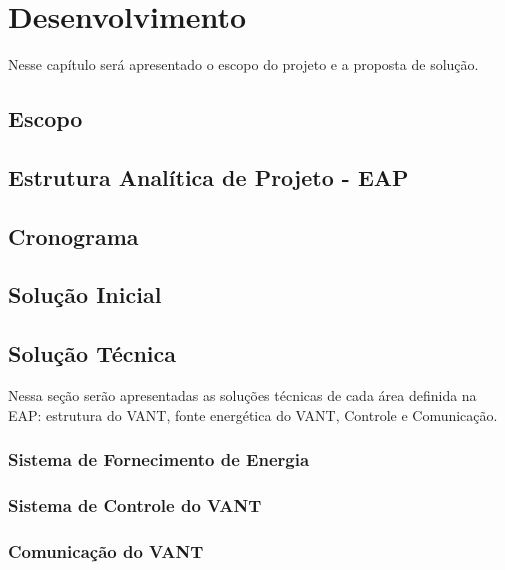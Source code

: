 \chapter{Desenvolvimento}\label{cap2}
 Nesse capítulo será apresentado o escopo do projeto e a proposta de solução.

 \section{Escopo}
  

\section{Estrutura Analítica de Projeto - EAP}
  
 
\section{Cronograma}
  

\section{Solução Inicial}
  

\section{Solução Técnica}
  Nessa seção serão apresentadas as soluções técnicas de cada área definida na EAP: estrutura do VANT,
  fonte energética do VANT, Controle e Comunicação.

%   
  
\subsection{Sistema de Fornecimento de Energia}
  

\subsection{Sistema de Controle do VANT}
  

\subsection{Comunicação do VANT}
  
